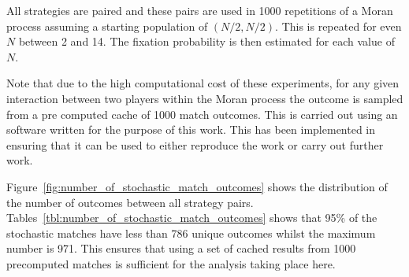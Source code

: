 \documentclass{article}
\begin{document}
All strategies are paired and these pairs are used in 1000 repetitions of a
Moran process assuming a starting population of \((N/2, N/2)\). This is repeated
for even \(N\) between 2 and 14. The fixation probability is then estimated for
each value of \(N\).

Note that due to the high computational cost of these experiments, for any given
interaction between two players within the Moran process the outcome is sampled
from a pre computed cache of 1000 match outcomes. This is carried out using an
software written for the purpose of this work. This has been
implemented in \cite{axelrodproject} ensuring that it can be used to either
reproduce the work or carry out further work.

Figure~\ref{fig:number_of_stochastic_match_outcomes} shows the distribution of
the number of outcomes between all strategy pairs.
Tables~\ref{tbl:number_of_stochastic_match_outcomes} shows that 95\% of the
stochastic matches have less than 786 unique outcomes whilst the maximum number
is 971. This ensures that using a set of cached results from 1000 precomputed
matches is sufficient for the analysis taking place here.
\end{document}
